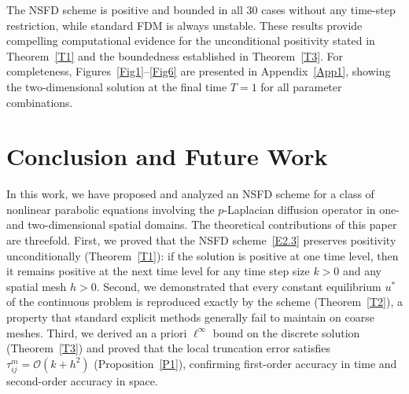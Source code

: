 \documentclass[final,12pt,3p]{elsarticle}
\theoremstyle{plain}
\theoremstyle{definition}
\theoremstyle{remark}
\begin{document}

%
The NSFD scheme is positive and bounded in all 30 cases without any time-step restriction, while standard FDM is always unstable.
These results provide compelling computational evidence for the unconditional positivity stated in Theorem~\ref{T1} and the boundedness established in Theorem~\ref{T3}.
For completeness, Figures~\ref{Fig1}--\ref{Fig6} are presented in Appendix~\ref{App1}, showing the two-dimensional solution at the final time $T=1$ for all parameter combinations.



\section*{Conclusion and Future Work}\label{S5}

In this work, we have proposed and analyzed an NSFD scheme for a class of nonlinear parabolic equations involving the $p$-Laplacian diffusion operator in one- and two-dimensional spatial domains.
%
The theoretical contributions of this paper are threefold.
First, we proved that the NSFD scheme~\eqref{E2.3} preserves positivity unconditionally (Theorem~\ref{T1}): if the solution is positive at one time level, then it remains positive at the next time level for any time step size $k > 0$ and any spatial mesh $h > 0$.
Second, we demonstrated that every constant equilibrium $u^*$ of the continuous problem is reproduced exactly by the scheme (Theorem~\ref{T2}), a property that standard explicit methods generally fail to maintain on coarse meshes.
Third, we derived an a priori $\ell^\infty$ bound on the discrete solution (Theorem~\ref{T3}) and proved that the local truncation error satisfies $\tau_{ij}^m = \mathcal{O}(k + h^2)$ (Proposition~\ref{P1}), confirming first-order accuracy in time and second-order accuracy in space.
\end{document}
